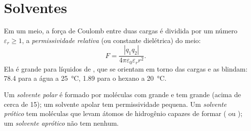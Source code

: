 \section{Solventes}

\begin{definition}\label{def:b1:intermolecular-forces-solvents:permittivity}
Em um meio, a força de Coulomb entre duas cargas é dividida por um número
$\varepsilon_r \ge 1$, a \emph{permissividade relativa}
(ou constante dielétrica) do meio:
\[
  F = \frac{|q_1 q_2|}{4\pi\varepsilon_0\varepsilon_r r^2} .
\]
Ela é grande para líquidos de , que se orientam em
torno das cargas e as blindam: \num{78.4} para a água a \qty{25}{\celsius},
\num{1.89} para o hexano a \qty{20}{\celsius}.
\end{definition}

\begin{definition}\label{def:b1:intermolecular-forces-solvents:solvent-classes}
Um \emph{solvente polar} é formado por moléculas
com grande  e tem grande  (acima
de cerca de 15); um solvente apolar tem permissividade pequena. Um
\emph{solvente prótico} tem moléculas que levam átomos de
hidrogênio capazes de formar  ( ou
); um \emph{solvente aprótico} não tem nenhum.
\end{definition}


